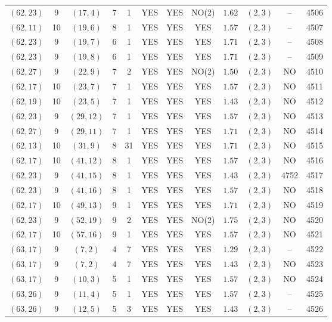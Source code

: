 \begin{longtable}{|c|c|c|c|c|c|c|c|c|c|c|c|}
$(62,23)$ & 9 & $(17,4)$ & 7 & 1 & YES & YES & NO(2) & $1.62$ & $(2,3)$ & -- & 4506\\
$(62,11)$ & 10 & $(19,6)$ & 8 & 1 & YES & YES & YES & $1.57$ & $(2,3)$ & -- & 4507\\
$(62,23)$ & 9 & $(19,7)$ & 6 & 1 & YES & YES & YES & $1.71$ & $(2,3)$ & -- & 4508\\
$(62,23)$ & 9 & $(19,8)$ & 6 & 1 & YES & YES & YES & $1.71$ & $(2,3)$ & -- & 4509\\
$(62,27)$ & 9 & $(22,9)$ & 7 & 2 & YES & YES & NO(2) & $1.50$ & $(2,3)$ & NO & 4510\\
$(62,17)$ & 10 & $(23,7)$ & 7 & 1 & YES & YES & YES & $1.57$ & $(2,3)$ & NO & 4511\\
$(62,19)$ & 10 & $(23,5)$ & 7 & 1 & YES & YES & YES & $1.43$ & $(2,3)$ & NO & 4512\\
$(62,23)$ & 9 & $(29,12)$ & 7 & 1 & YES & YES & YES & $1.57$ & $(2,3)$ & NO & 4513\\
$(62,27)$ & 9 & $(29,11)$ & 7 & 1 & YES & YES & YES & $1.71$ & $(2,3)$ & NO & 4514\\
$(62,13)$ & 10 & $(31,9)$ & 8 & 31 & YES & YES & YES & $1.71$ & $(2,3)$ & NO & 4515\\
$(62,17)$ & 10 & $(41,12)$ & 8 & 1 & YES & YES & YES & $1.57$ & $(2,3)$ & NO & 4516\\
$(62,23)$ & 9 & $(41,15)$ & 8 & 1 & YES & YES & YES & $1.43$ & $(2,3)$ & 4752 & 4517\\
$(62,23)$ & 9 & $(41,16)$ & 8 & 1 & YES & YES & YES & $1.57$ & $(2,3)$ & NO & 4518\\
$(62,17)$ & 10 & $(49,13)$ & 9 & 1 & YES & YES & YES & $1.71$ & $(2,3)$ & NO & 4519\\
$(62,23)$ & 9 & $(52,19)$ & 9 & 2 & YES & YES & NO(2) & $1.75$ & $(2,3)$ & NO & 4520\\
$(62,17)$ & 10 & $(57,16)$ & 9 & 1 & YES & YES & YES & $1.57$ & $(2,3)$ & NO & 4521\\
$(63,17)$ & 9 & $(7,2)$ & 4 & 7 & YES & YES & YES & $1.29$ & $(2,3)$ & -- & 4522\\
$(63,17)$ & 9 & $(7,2)$ & 4 & 7 & YES & YES & YES & $1.43$ & $(2,3)$ & NO & 4523\\
$(63,17)$ & 9 & $(10,3)$ & 5 & 1 & YES & YES & YES & $1.57$ & $(2,3)$ & NO & 4524\\
$(63,26)$ & 9 & $(11,4)$ & 5 & 1 & YES & YES & YES & $1.57$ & $(2,3)$ & -- & 4525\\
$(63,26)$ & 9 & $(12,5)$ & 5 & 3 & YES & YES & YES & $1.43$ & $(2,3)$ & -- & 4526\\

\end{longtable}
